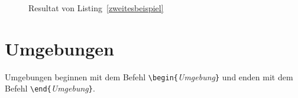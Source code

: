 

\begin{figure}[H]
    \caption{Resultat von Listing~\ref{zweitesbeispiel}}
    \label{fig_Listing2}
\end{figure}


\section{Umgebungen}

Umgebungen beginnen mit dem Befehl \verb!\begin{!\textsl{Umgebung}\verb!}!
und enden mit dem Befehl \verb!\end{!\textsl{Umgebung}\verb!}!.

